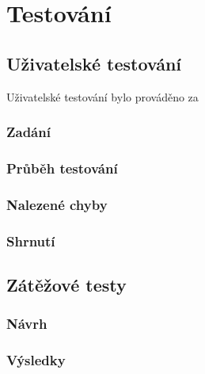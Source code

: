 \chapter{Testování}


\section{Uživatelské testování}
Uživatelské testování bylo prováděno za 



\subsection{Zadání}

\subsection{Průběh testování}

\subsection{Nalezené chyby}

\subsection{Shrnutí}







\newpage

\section{Zátěžové testy}\label{zatezove_testy}

\subsection{Návrh}

\subsection{Výsledky}

